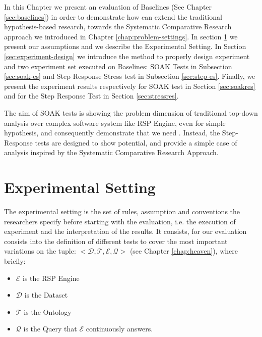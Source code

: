

In this Chapter we present an evaluation of \name Baselines (See Chapter \ref{sec:baselines}) in order to demonstrate how \name can extend the traditional hypothesis-based research, towards the Systematic Comparative Research approach we introduced in Chapter \ref{chap:problem-settings}. In section \ref{sec:experimental-setting} we present our assumptions and we describe the Experimental Setting. In Section \ref{sec:experiment-design} we introduce the method to properly design experiment and two experiment set executed on \name Baselines: SOAK Tests in Subsection \ref{sec:soak-es} and Step Response Stress test in Subsection \ref{sec:step-es}. Finally, we present the experiment results respectively for SOAK test in Section \ref{sec:soakres} and for the Step Response Test in Section \ref{sec:stressres}.

The aim of SOAK tests is showing the problem dimension of traditional top-down analysis over complex software system like RSP Engine, even for simple hypothesis, and consequently demonstrate that we need \namens. Instead, the Step-Response tests are designed to show \name potential, and provide a simple case of analysis inspired by the Systematic Comparative Research Approach.

\section{Experimental Setting}
\label{sec:experimental-setting}
The experimental setting is the set of rules, assumption and conventions the researchers specify before starting with the evaluation, i.e. the execution of experiment and the interpretation of the results. It consists, for our evaluation consists into the definition of different tests to cover the most important variations on the tuple: $<\mathcal{D}, \mathcal{T},\mathcal{E}, \mathcal{Q}>$  (see Chapter \ref{chap:heaven}), where briefly:
\begin{itemize}
\item $\mathcal{E}$ is the RSP Engine
\item $\mathcal{D}$ is the Dataset 
\item $\mathcal{T}$ is the Ontology
\item $\mathcal{Q}$ is the Query that $\mathcal{E}$ continuously answers.
\end{itemize}

